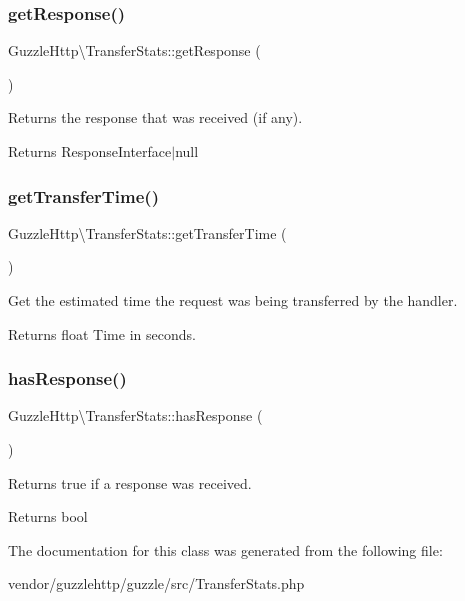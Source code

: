 \subsubsection{\texorpdfstring{get\+Response()}{getResponse()}}
{\footnotesize\ttfamily Guzzle\+Http\textbackslash{}\+Transfer\+Stats\+::get\+Response (\begin{DoxyParamCaption}{ }\end{DoxyParamCaption})}

Returns the response that was received (if any).

\begin{DoxyReturn}{Returns}
Response\+Interface$\vert$null 
\end{DoxyReturn}
\mbox{\label{classGuzzleHttp_1_1TransferStats_adc88f8894bdbaf833c2dd248d9f236b3}} 
\subsubsection{\texorpdfstring{get\+Transfer\+Time()}{getTransferTime()}}
{\footnotesize\ttfamily Guzzle\+Http\textbackslash{}\+Transfer\+Stats\+::get\+Transfer\+Time (\begin{DoxyParamCaption}{ }\end{DoxyParamCaption})}

Get the estimated time the request was being transferred by the handler.

\begin{DoxyReturn}{Returns}
float Time in seconds. 
\end{DoxyReturn}
\mbox{\label{classGuzzleHttp_1_1TransferStats_a31b5781cf81cbdec28c5747cae624b1e}} 
\subsubsection{\texorpdfstring{has\+Response()}{hasResponse()}}
{\footnotesize\ttfamily Guzzle\+Http\textbackslash{}\+Transfer\+Stats\+::has\+Response (\begin{DoxyParamCaption}{ }\end{DoxyParamCaption})}

Returns true if a response was received.

\begin{DoxyReturn}{Returns}
bool 
\end{DoxyReturn}


The documentation for this class was generated from the following file\+:\begin{DoxyCompactItemize}
\item 
vendor/guzzlehttp/guzzle/src/Transfer\+Stats.\+php\end{DoxyCompactItemize}
